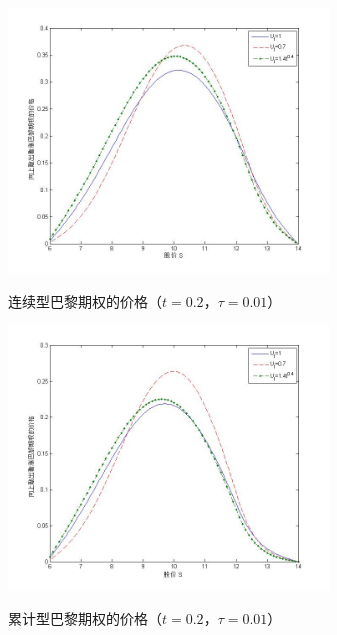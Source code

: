 \documentclass{ctexart} %
\begin{document}
\begin{figure}[H]
\begin{minipage}{0.48\linewidth}
\label{t0.2}
\includegraphics[width=8.5cm]{code/t0.2.jpg}
\caption{连续型巴黎期权的价格（$t=0.2$，$\tau=0.01$）}
\end{minipage}
\begin{minipage}{0.48\linewidth}
\label{t0.2c}
\includegraphics[width=8.5cm]{code/tc0.2.jpg}
\caption{累计型巴黎期权的价格（$t=0.2$，$\tau=0.01$）}
\end{minipage}
\end{figure}
\end{document}
